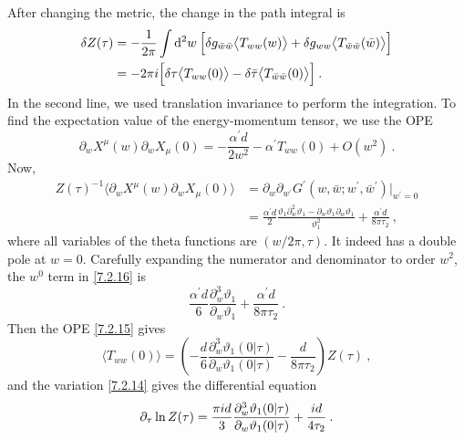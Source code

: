 After changing the metric, the change in the path integral is 
\begin{align}
	\delta Z(\tau) &= -\frac{1}{2 \pi} \int \mathrm{d}^{2} w \: \Bigl[\delta g_{\bar{w} \bar{w}} 
	\bigl\langle T_{w w}(w)\bigr\rangle+\delta g_{w w}\bigl\langle T_{\bar{w} \bar{w}}(\bar{w})\bigr\rangle\Bigr] \nonumber \\
	&=-2 \pi i\Bigl[\delta \tau \bigl\langle T_{w w}(0)\bigr\rangle - \delta \bar{\tau}\bigl\langle T_{\bar{w} \bar{w}}(0)\bigr\rangle\Bigr] \:. \label{7.2.14} 
\end{align}
In the second line, we used translation invariance to perform the integration. To find the expectation value of the energy-momentum tensor, we use the OPE 
\begin{equation}
	\partial_{w} X^{\mu}(w) \partial_{w} X_{\mu}(0)=-\frac{\alpha^{\prime} d}{2 w^{2}}-\alpha^{\prime} T_{w w}(0)+O(w^{2}) \:. \label{7.2.15} 
\end{equation}
Now, 
\begin{align}
	Z(\tau)^{-1}\langle\partial_{w} X^{\mu}(w) \partial_{w} X_{\mu}(0)\rangle 
	&= \partial_{w} \partial_{w^{\prime}} G^{\prime}(w, \bar{w} ; w^{\prime}, \bar{w}^{\prime})|_{w^{\prime}=0} \nonumber \\
	&=\frac{\alpha^{\prime} d}{2} \frac{\vartheta_{1} \partial_{w}^{2} \vartheta_{1}-\partial_{w} \vartheta_{1} \partial_{w} \vartheta_{1}}{\vartheta_{1}^{2}}+\frac{\alpha^{\prime} d}{8 \pi \tau_{2}} \:, \label{7.2.16} 
\end{align}
where all variables of the theta functions are $(w / 2 \pi, \tau)$. 
It indeed has a double pole at $w=0 $. Carefully expanding the numerator and denominator to order $w^{2}$, the $w^{0}$ term in \eqref{7.2.16} is 
\begin{equation}
	\frac{\alpha^{\prime} d}{6} \frac{\partial_{w}^{3} \vartheta_{1}}{\partial_{w} \vartheta_{1}}+\frac{\alpha^{\prime} d}{8 \pi \tau_{2}} \:. \label{7.2.17} 
\end{equation}
Then the OPE \eqref{7.2.15} gives 
\begin{equation}
	\langle T_{w w}(0)\rangle=\left(-\frac{d}{6} \frac{\partial_{w}^{3} \vartheta_{1}(0 \vert \tau)}{\partial_{w} \vartheta_{1}(0 \vert\tau)}-\frac{d}{8 \pi \tau_{2}}\right) Z(\tau) \:, \label{7.2.18} 
\end{equation}
and the variation \eqref{7.2.14} gives the differential equation 
\begin{equation}
	\partial_{\tau} \ln Z(\tau)=\frac{\pi i d}{3} \frac{\partial_{w}^{3} \vartheta_{1}(0 \vert \tau)}{\partial_{w} \vartheta_{1}(0 \vert \tau)}+\frac{i d}{4 \tau_{2}} \:. \label{7.2.19} 
\end{equation}
